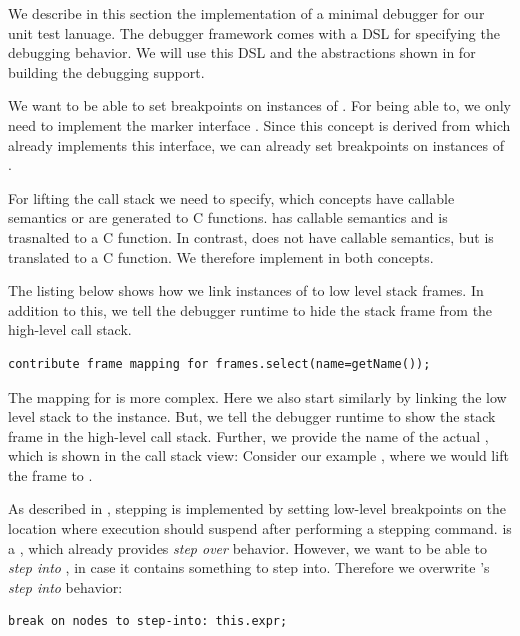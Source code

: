 We describe in this section the implementation of a minimal debugger
for our unit test lanuage. The debugger framework comes with a \ac{DSL}
for specifying the debugging behavior. We will use this \ac{DSL} and the
abstractions shown in  for building the debugging support.

  We want to be able to set breakpoints on instances of
. For being able to, we only need to implement the marker
interface . Since this concept
is derived from  which already implements this
interface, we can already set breakpoints on instances of .

 For lifting the call stack we need to specify, which
concepts have callable semantics or are generated to C functions. 
 has callable semantics and is trasnalted to a C
function. In contrast,  does not have callable
semantics, but is translated to a C function. We therefore implement 
 in both concepts.

The listing below shows how we link instances of
 to low level stack frames. In addition to this, we
tell the debugger runtime to hide the stack frame from the high-level call stack.

\begin{lstlisting}[language=mbeddr,frame=single]
contribute frame mapping for frames.select(name=getName());
\end{lstlisting}


The mapping for  is more complex. Here we also start similarly by
linking the low level stack to the  instance. But, we tell the
debugger runtime to show the stack frame in the high-level call stack.
Further, we provide the name of the actual , which is shown in the
call stack view: Consider our example , where we would
lift the frame  to .

 As described in , stepping is
implemented by setting low-level breakpoints on the 
location where execution should suspend after
performing a stepping command.  is a , which
already provides \emph{step over} behavior. However, we want to be able to 
\emph{step into} , in case it contains something to step into. 
Therefore we overwrite 's \emph{step into} behavior: 
\begin{lstlisting}[language=mbeddr,frame=single]
break on nodes to step-into: this.expr;
\end{lstlisting}

